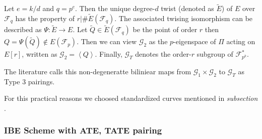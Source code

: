 
Let $e = k/d$ and $q=p^e$. Then the unique degree-$d$ twist (denoted as $\tilde{E}$) of $E$ over
$\mathcal{F}_q$ has the property of $r | \# \tilde{E} (\mathcal{F}_q)$. The associated
twising isomorphism can be described as $\Psi: \tilde{E} \rightarrow E$. Let $\tilde{Q} \in \tilde{E}(\mathcal{F}_q)$
be the point of order $r$ then $Q = \Psi (\tilde{Q}) \notin E(\mathcal{F}_p)$. Then we
can view $\mathcal{G}_2$ as the $p$-eigenspace of $\Pi$ acting on $E[r]$, written as
$\mathcal{G}_2 = \left< Q \right>$. Finally, $\mathcal{G}_T$ denotes the order-$r$ subgroup
of $\mathcal{F}^*_{p^k}$.\cite{ecc.pairings.param}

The literature calls this non-degeneratte biliniear maps from $\mathcal{G}_1 \times \mathcal{G}_2$
to $\mathcal{G}_T$ as Type 3 pairings. \cite{ecc.pairings.param}


For this practical reasons we choosed standardized curves mentioned in
\textit{subsection \label{ssec:ibe.bonehfranklin.scheme}}.

\subsubsection{IBE Scheme with ATE, TATE pairing}



